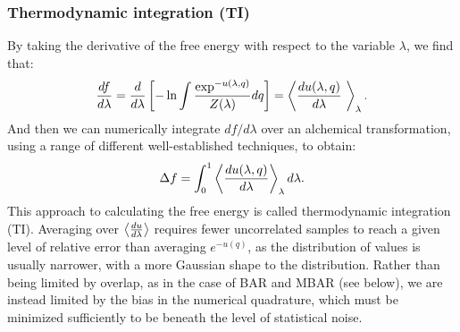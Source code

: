 \subsubsection{Thermodynamic integration (TI)}
By taking the derivative of the free energy with respect to the
variable $\lambda$, we find that:
\begin{equation}
\frac{df}{d\lambda} = \frac{d}{d\lambda} \left[-\ln \int \frac{\exp^{-u(\lambda,q)}}{Z(\lambda)} dq\right] = \left\langle{\frac{du(\lambda,q)}{d\lambda}\
}\right\rangle_{\lambda} .
\end{equation}
And then we can numerically integrate $df/d\lambda$ over an alchemical transformation, using a range of different well-established techniques, to obtain:
\begin{equation}
\Delta f    = \int_{0}^{1} \left\langle{\frac{du(\lambda,q)}{d\lambda}}\right\rangle_{\lambda}  d\lambda.    
\end{equation}
This approach to calculating the free energy is called thermodynamic integration (TI). Averaging over $\left\langle{\frac{du}{d\lambda}}\right\rangle$ requires fewer uncorrelated samples to reach a given level of relative error
than averaging $e^{-u(q)}$, as the distribution of values is usually narrower, with a more Gaussian shape to the distribution. Rather than being limited by overlap, as in the case of BAR and MBAR (see below), we are instead limited by the bias in the numerical quadrature, which must be minimized sufficiently to be beneath the level of statistical noise.

